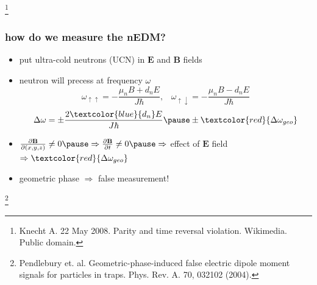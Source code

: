 \documentclass{beamer}
\renewcommand{\vec}{\mathbf}
\newcommand{\bottomcite}{\let\thefootnote\relax\footnote}
\begin{document}
\begin{frame}
\begin{columns}
    \end{columns}
    
    \bottomcite{Knecht A. 22 May 2008. Parity and time reversal violation. Wikimedia. Public domain.}

\end{frame}

\begin{frame}
\frametitle{how do we measure the nEDM?}

    \begin{itemize}
        \item put ultra-cold neutrons (UCN) in $\vec{E}$ and $\vec{B}$ fields \pause
        \item neutron will precess at frequency $\omega$
        \begin{equation}
        \omega_{\uparrow\uparrow} = -\frac{\mu_n B + d_n E}{J\hbar}, \;\;\;
        \omega_{\uparrow\downarrow} = -\frac{\mu_n B - d_n E}{J\hbar}
        \end{equation} \pause
        \begin{equation}
        \Delta\omega = \pm\frac{2 \textcolor{blue}{d_n} E}{J\hbar} \pause \pm 
        \textcolor{red}{\Delta\omega_{geo}}
        \end{equation} \pause
        \item $\frac{\partial \vec{B}}{\partial (x,y,z)} \neq 0 \pause \Rightarrow
        \frac{\partial \vec{B}}{\partial t} \neq 0 \pause \Rightarrow$ effect of $\vec{E}$ field
        \pause
        $\Rightarrow \textcolor{red}{\Delta\omega_{geo}}$ \pause
        \bigskip
        \item geometric phase $\Rightarrow$ false measurement! 
    \end{itemize}

    \bottomcite{Pendlebury et. al. Geometric-phase-induced false electric dipole moment signals
    for particles in traps. Phys. Rev. A. 70, 032102 (2004).}

\end{frame}
\end{document}
